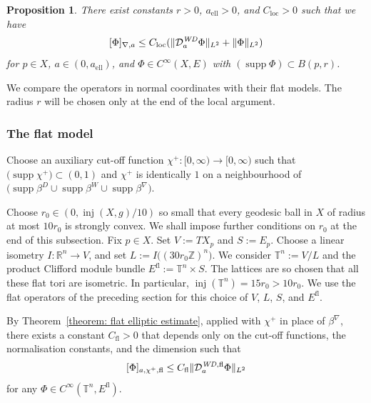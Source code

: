 \documentclass[a4paper,oneside,12pt]{amsart}
\theoremstyle{plain}
\newtheorem{proposition}[theorem]{Proposition}
\theoremstyle{definition}
\theoremstyle{remark}
\newcommand{\Z}{\mathbb{Z}}
\newcommand{\R}{\mathbb{R}}
\DeclarePairedDelimiter{\norm}{\lVert}{\rVert}
\DeclarePairedDelimiter{\seminorm}{\lbrack}{\rbrack}
\DeclareMathOperator{\support}{supp}
\DeclareMathOperator{\injectivityradius}{inj}
\newcommand{\flattorus}{\mathbb{T}^n}
\newcommand{\Lattice}{L}
\newcommand{\Ltwonorm}[2][L^2]{\norm{#2}_{#1}}
\newcommand{\mesoscopicdifferenceseminorm}[2][a]{\seminorm{#2}_{\nabla,#1}}
\newcommand{\flatmesoscopicdifferenceseminorm}[3][a]{\seminorm{#3}_{#1,#2,\mathrm{fl}}}
\newcommand{\mesoscopicWilsonDiracoperator}[1][a]{\mathcal{D}_{#1}^{\mathit{WD}}}
\newcommand{\cutoff}{\beta}
\newcommand{\cutoffDirac}{\cutoff^D}
\newcommand{\cutoffWilson}{\cutoff^W}
\newcommand{\cutoffnabla}{\cutoff^{\nabla}}
\newcommand{\cutoffupper}{\chi^+}
\newcommand{\flatmesoscopicWilsonDiracoperator}[1][a]{\mathcal{D}_{#1}^{\mathit{WD},\mathrm{fl}}}
\newcommand{\flatmodel}[1]{#1^{\mathrm{fl}}}
\newcommand{\constantlocal}{C_{\mathrm{loc}}}
\newcommand{\constantflat}{C_{\mathrm{fl}}}
\newcommand{\constantAell}{a_{\mathrm{ell}}}
\begin{document}
\begin{proposition}\label{proposition: local elliptic estimate}
  There exist constants $r > 0$, $\constantAell > 0$, and $\constantlocal > 0$ such that we have
  \begin{equation}
    \mesoscopicdifferenceseminorm{\Phi} \le \constantlocal (\Ltwonorm{\mesoscopicWilsonDiracoperator \Phi} + \Ltwonorm{\Phi})
  \end{equation}
  for $p \in X$, $a \in (0,\constantAell)$, and $\Phi \in C^{\infty}(X,E)$ with $(\support \Phi) \subset B(p,r)$.
\end{proposition}

We compare the operators in normal coordinates with their flat models.
The radius $r$ will be chosen only at the end of the local argument.

\subsubsection{The flat model}\label{subsubsection: the flat model}

Choose an auxiliary cut-off function $\cutoffupper \colon [0,\infty) \to [0,\infty)$ such that $\big(\support \cutoffupper\big) \subset (0,1)$ and $\cutoffupper$ is identically $1$ on a neighbourhood of $\bigl( \support \cutoffDirac \cup \support \cutoffWilson \cup \support \cutoffnabla \bigr)$.

Choose $r_0 \in (0,\injectivityradius(X,g)/10)$ so small that every geodesic ball in $X$ of radius at most $10 r_0$ is strongly convex.
We shall impose further conditions on $r_0$ at the end of this subsection.
Fix $p \in X$.
Set $V := TX_p$ and $S := E_p$.
Choose a linear isometry $I \colon \R^n \to V$, and set $\Lattice := I\big((30r_0\Z)^n \big)$.
We consider $\flattorus := V/\Lattice$ and the product Clifford module bundle $\flatmodel{E} := \flattorus \times S$.
The lattices are so chosen that all these flat tori are isometric.
In particular, $\injectivityradius(\flattorus) = 15r_0 > 10r_0$.
We use the flat operators of the preceding section for this choice of $V$, $\Lattice$, $S$, and $\flatmodel{E}$.

By Theorem~\ref{theorem: flat elliptic estimate}, applied with $\cutoffupper$ in place of $\cutoffnabla$, there exists a constant $\constantflat > 0$ that depends only on the cut-off functions, the normalisation constants, and the dimension such that
\begin{equation}\label{inequality: flat elliptic estimate}
  \flatmesoscopicdifferenceseminorm{\cutoffupper}{\Phi} \le \constantflat \Ltwonorm{\flatmesoscopicWilsonDiracoperator \Phi}
\end{equation}
for any $\Phi \in C^{\infty}(\flattorus,\flatmodel{E})$.
\end{document}
